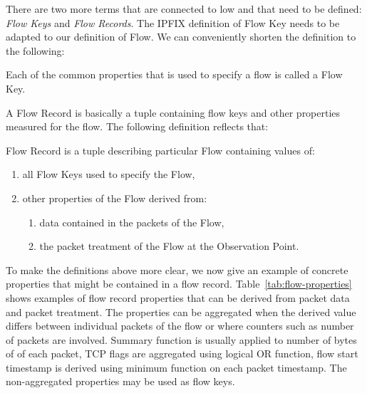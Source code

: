 There are two more terms that are connected to low and that need to be defined: \emph{Flow Keys} and \emph{Flow Records}. The IPFIX definition of Flow Key needs to be adapted to our definition of Flow. We can conveniently shorten the definition to the following:

\begin{displayquote}

    Each of the common properties that is used to specify a flow is called a Flow Key.

\end{displayquote}

A Flow Record is basically a tuple containing flow keys and other properties measured for the flow. The following definition reflects that:

\begin{displayquote}

    Flow Record is a tuple describing particular Flow containing values of:

    \begin{enumerate}
    	\item all Flow Keys used to specify the Flow,
    	\item other properties of the Flow derived from:
    	\begin{enumerate}
    		\item data contained in the packets of the Flow,
    		\item the packet treatment of the Flow at the Observation Point.
    	\end{enumerate}

    \end{enumerate}

\end{displayquote}

To make the definitions above more clear, we now give an example of concrete properties that might be contained in a flow record. Table~\ref{tab:flow-properties} shows examples of flow record properties that can be derived from packet data and packet treatment. The properties can be aggregated when the derived value differs between individual packets of the flow or where counters such as number of packets are involved. Summary function is usually applied to number of bytes of of each packet, TCP flags are aggregated using logical OR function, flow start timestamp is derived using minimum function on each packet timestamp. The non-aggregated properties may be used as flow keys.

